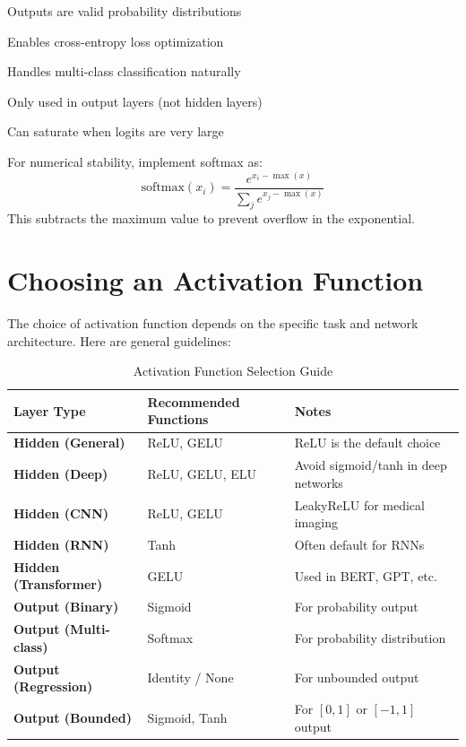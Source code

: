 \begin{advantages}
    \item Outputs are valid probability distributions
    \item Enables cross-entropy loss optimization
    \item Handles multi-class classification naturally
\end{advantages}

\begin{disadvantages}
    \item Only used in output layers (not hidden layers)
    \item Can saturate when logits are very large
\end{disadvantages}

\begin{note}
For numerical stability, implement softmax as:
\begin{equation}
\text{softmax}(x_i) = \frac{e^{x_i - \max(x)}}{\sum_j e^{x_j - \max(x)}}
\end{equation}
This subtracts the maximum value to prevent overflow in the exponential.
\end{note}

\section{Choosing an Activation Function}

The choice of activation function depends on the specific task and network architecture. Here are general guidelines:

\begin{table}[ht]
    \centering
    \caption{Activation Function Selection Guide}
    \begin{tabular}{L{3cm} L{5cm} L{4cm}}
        \toprule
        \textbf{Layer Type} & \textbf{Recommended Functions} & \textbf{Notes} \\
        \midrule
        \textbf{Hidden (General)} & ReLU, GELU & ReLU is the default choice \\
        \textbf{Hidden (Deep)} & ReLU, GELU, ELU & Avoid sigmoid/tanh in deep networks \\
        \textbf{Hidden (CNN)} & ReLU, GELU & LeakyReLU for medical imaging \\
        \textbf{Hidden (RNN)} & Tanh & Often default for RNNs \\
        \textbf{Hidden (Transformer)} & GELU & Used in BERT, GPT, etc. \\
        \textbf{Output (Binary)} & Sigmoid & For probability output \\
        \textbf{Output (Multi-class)} & Softmax & For probability distribution \\
        \textbf{Output (Regression)} & Identity / None & For unbounded output \\
        \textbf{Output (Bounded)} & Sigmoid, Tanh & For $[0,1]$ or $[-1,1]$ output \\
        \bottomrule
    \end{tabular}
\end{table}

